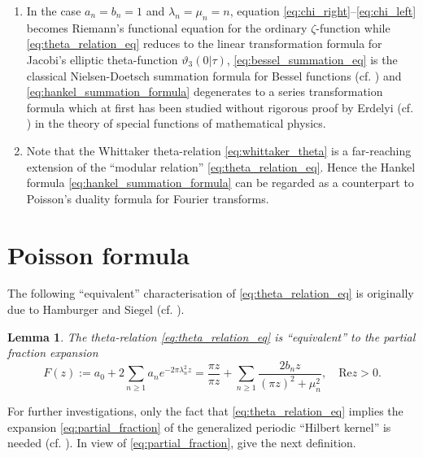 \documentclass{article}
\newcommand{\assign}{:=}
\newcommand{\tmdummy}{$\mbox{}$}
\newtheorem{lemma}{Lemma}
{\theorembodyfont{\rmfamily}\newtheorem{remark}{Remark}}
\begin{document}
\begin{remark}
  \label{rem:remarks_2_5}{\tmdummy}
  
  \begin{enumerate}
    \item In the case $a_n = b_n = 1$ and $\lambda_n = \mu_n = n$, equation
    \eqref{eq:chi_right}--\eqref{eq:chi_left} becomes Riemann's functional
    equation for the ordinary $\zeta$-function while
    \eqref{eq:theta_relation_eq} reduces to the linear transformation formula
    for Jacobi's elliptic theta-function $\vartheta_3 (0| \tau)$,
    \eqref{eq:bessel_summation_eq} is the classical Nielsen-Doetsch summation
    formula for Bessel functions (cf. {\cite{15,31}}) and
    \eqref{eq:hankel_summation_formula} degenerates to a series transformation
    formula which at first has been studied without rigorous proof by Erdelyi
    (cf. {\cite{1,17}}) in the theory of special functions of mathematical
    physics.
    
    \item Note that the Whittaker theta-relation \eqref{eq:whittaker_theta} is
    a far-reaching extension of the ``modular relation''
    \eqref{eq:theta_relation_eq}. Hence the Hankel formula
    \eqref{eq:hankel_summation_formula} can be regarded as a counterpart to
    Poisson's duality formula for Fourier transforms.
  \end{enumerate}
\end{remark}

\section{Poisson formula}\label{sec:poisson}

The following ``equivalent'' characterisation of \eqref{eq:theta_relation_eq}
is originally due to Hamburger and Siegel (cf. {\cite{4,11,19,29}}).

\begin{lemma}
  \label{lem:hilbert_kernel}The theta-relation \eqref{eq:theta_relation_eq} is
  ``equivalent'' to the partial fraction expansion
  \begin{equation}
    F (z) \assign a_0 + 2 \sum_{n \geq 1} a_n e^{- 2 \pi \lambda_n^2 z} =
    \frac{\pi z}{\pi z} + \sum_{n \geq 1} \frac{2 b_n z}{(\pi z)^2 + \mu_n^2},
    \quad \mathrm{Re} z > 0. \label{eq:partial_fraction}
  \end{equation}
\end{lemma}

For further investigations, only the fact that \eqref{eq:theta_relation_eq}
implies the expansion \eqref{eq:partial_fraction} of the generalized periodic
``Hilbert kernel'' is needed (cf. {\cite{6}}). In view of
\eqref{eq:partial_fraction}, give the next definition.
\end{document}
